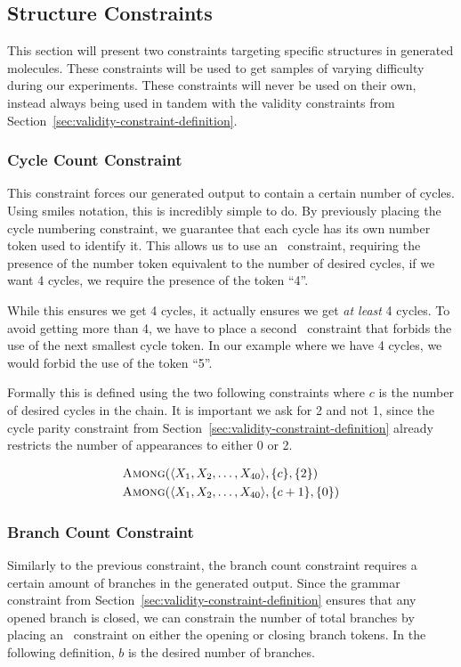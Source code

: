 \documentclass[../Document.tex]{subfiles}
\begin{document}
\subsection{Structure Constraints}
This section will present two constraints targeting specific structures in generated molecules. These constraints will be used to get samples of varying difficulty during our experiments. These constraints will never be used on their own, instead always being used in tandem with the validity constraints from Section~\ref{sec:validity-constraint-definition}.

\subsubsection{Cycle Count Constraint}
This constraint forces our generated output to contain a certain number of cycles. 
Using \gls{smiles} notation, this is incredibly simple to do.
By previously placing the cycle numbering constraint, we guarantee that each cycle has its own number token used to identify it.
This allows us to use an \among\ constraint, requiring the presence of the number token equivalent to the number of desired cycles, \eg if we want 4 cycles, we require the presence of the token ``4''.

While this ensures we get 4 cycles, it actually ensures we get \textit{at least} 4 cycles. To avoid getting more than 4, we have to place a second \among\ constraint that forbids the use of the next smallest cycle token. In our example where we have 4 cycles, we would forbid the use of the token ``5''.

Formally this is defined using the two following constraints where $c$ is the number of desired cycles in the chain. It is important we ask for 2 and not 1, since the cycle parity constraint from Section~\ref{sec:validity-constraint-definition} already restricts the number of appearances to either 0 or 2. 

\begin{align*}
    &\mbox{\sc Among}(\langle X_1, X_2, \ldots, X_{40} \rangle, \{c\}, \{2\})\\
    &\mbox{\sc Among}(\langle X_1, X_2, \ldots, X_{40} \rangle, \{c+1\}, \{0\})
\end{align*}


\subsubsection{Branch Count Constraint}
Similarly to the previous constraint, the branch count constraint requires a certain amount of branches in the generated output. Since the grammar constraint from Section~\ref{sec:validity-constraint-definition} ensures that any opened branch is closed, we can constrain the number of total branches by placing an \among\ constraint on either the opening or closing branch tokens. In the following definition, $b$ is the desired number of branches.
\end{document}
